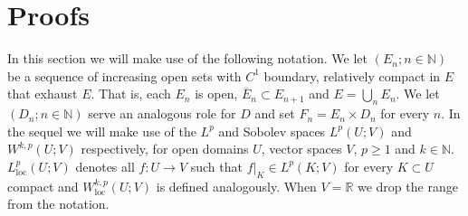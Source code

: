 \documentclass{article}
\theoremstyle{plain}
\theoremstyle{definition}
\newcommand{\R}{\mathbb{R}}
\newcommand{\N}{\mathbb{N}}
\numberwithin{lem}{section}
\begin{document}
\appendix
\section{Proofs} \label{sec:proofs}
In this section we will make use of the following notation. We let $(E_n; n \in \N)$ be a sequence of increasing open sets with $C^1$ boundary, relatively compact in $E$ that exhaust $E$. That is, each $E_n$ is open, $\overline E_n \subset E_{n+1}$ and $E =  \bigcup_n E_n$.  We let $(D_n;n\in \N)$ serve an analogous role for $D$ and set $F_n = E_n \times D_n$ for every $n$. In the sequel we will make use of the $L^p$ and Sobolev spaces $L^p(U;V)$ and $W^{k,p}(U;V)$ respectively, for open domains $U$, vector spaces $V$, $p \geq 1$ and $k \in \N$. $L^p_{\mathrm{loc}}(U;V)$ denotes all $f: U \to V$ such that $f|_{K} \in L^p(K;V)$ for every $K \subset U$ compact and $W^{k,p}_{\mathrm{loc}}(U;V)$ is defined analogously. When $V  = \R$ we drop the range from the notation.

\end{document}
